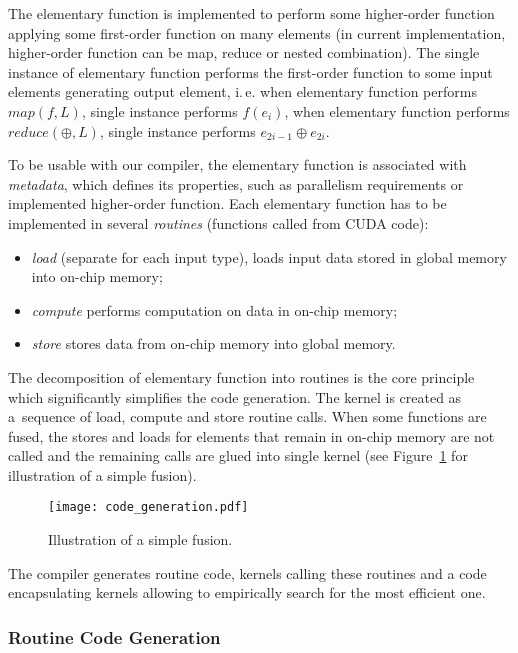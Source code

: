 \documentclass[final]{siamltex}
\def\ie{i.\,e.}
\begin{document}
{The elementary function is implemented to perform some higher-order function applying some first-order function on many elements (in current implementation, higher-order function can be map, reduce or nested combination). The single instance of elementary function performs the first-order function to some input elements generating output element, \ie{} when elementary function performs $map(f, L)$, single instance performs $f(e_i)$, when elementary function performs $reduce(\oplus, L)$, single instance performs $e_{2i-1} \oplus e_{2i}$.

To be usable with our compiler, the elementary function is associated with \textit{metadata}, which defines its properties, such as parallelism requirements or implemented higher-order function. Each elementary function has to be implemented in several \textit{routines} (functions called from CUDA code):
\begin{itemize}
        \item \textit{load} (separate for each input type), loads input data stored in global memory into on-chip memory;
        \item \textit{compute} performs computation on data in on-chip memory;
        \item \textit{store} stores data from on-chip memory into global memory.
\end{itemize}

The decomposition of elementary function into routines is the core principle which significantly simplifies the code generation. The kernel is created as a~sequence of load, compute and store routine calls. When some functions are fused, the stores and loads for elements that remain in on-chip memory are not called and the remaining calls are glued into single kernel (see Figure~\ref{fig:code_fusion} for illustration of a simple fusion).

\begin {figure}[h]
  \begin{center}
    \texttt{[image: code\_generation.pdf]}
  \end{center}
  \caption{Illustration of a simple fusion.}
  \label{fig:code_fusion}
\end {figure}

The compiler generates routine code, kernels calling these routines and a code encapsulating kernels allowing to empirically search for the most efficient one.

\subsubsection{Routine Code Generation}

}
\end{document}
